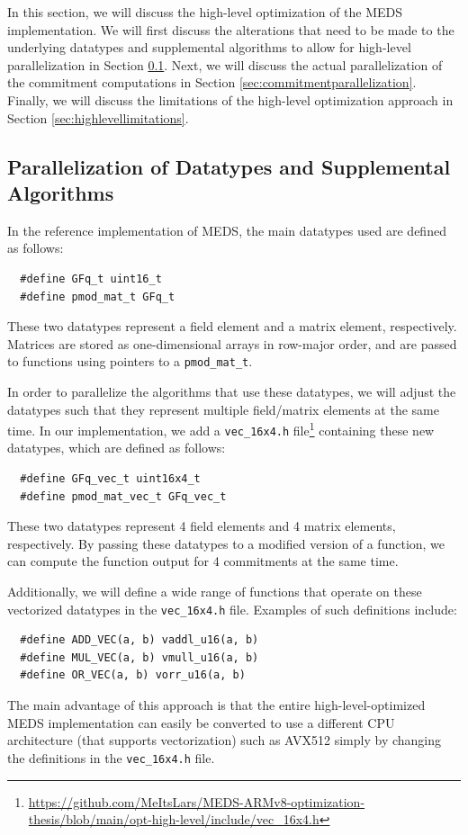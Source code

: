 \documentclass[11pt,a4paper]{report}
\theoremstyle{definition}
\begin{document}
In this section, we will discuss the high-level optimization of the MEDS implementation. We will first discuss the alterations that need to be made to the underlying datatypes and supplemental algorithms to allow for high-level parallelization in Section \ref{sec:highleveldataalgorithms}. Next, we will discuss the actual parallelization of the commitment computations in Section \ref{sec:commitmentparallelization}. Finally, we will discuss the limitations of the high-level optimization approach in Section \ref{sec:highlevellimitations}.

\subsection{Parallelization of Datatypes and Supplemental Algorithms}
\label{sec:highleveldataalgorithms}
In the reference implementation of MEDS, the main datatypes used are defined as follows:
\begin{verbatim}
  #define GFq_t uint16_t
  #define pmod_mat_t GFq_t
\end{verbatim}
These two datatypes represent a field element and a matrix element, respectively. Matrices are stored as one-dimensional arrays in row-major order, and are passed to functions using pointers to a \texttt{pmod\_mat\_t}.

In order to parallelize the algorithms that use these datatypes, we will adjust the datatypes such that they represent multiple field/matrix elements at the same time. In our implementation, we add a \texttt{vec\_16x4.h} file\footnote{\url{https://github.com/MeItsLars/MEDS-ARMv8-optimization-thesis/blob/main/opt-high-level/include/vec\_16x4.h}} containing these new datatypes, which are defined as follows:
\begin{verbatim}
  #define GFq_vec_t uint16x4_t
  #define pmod_mat_vec_t GFq_vec_t
\end{verbatim}
These two datatypes represent 4 field elements and 4 matrix elements, respectively. By passing these datatypes to a modified version of a function, we can compute the function output for 4 commitments at the same time.

Additionally, we will define a wide range of functions that operate on these vectorized datatypes in the \texttt{vec\_16x4.h} file. Examples of such definitions include:
\begin{verbatim}
  #define ADD_VEC(a, b) vaddl_u16(a, b)
  #define MUL_VEC(a, b) vmull_u16(a, b)
  #define OR_VEC(a, b) vorr_u16(a, b)
\end{verbatim}
The main advantage of this approach is that the entire high-level-optimized MEDS implementation can easily be converted to use a different CPU architecture (that supports vectorization) such as AVX512 \cite{intel-avx512} simply by changing the definitions in the \texttt{vec\_16x4.h} file.
\end{document}
